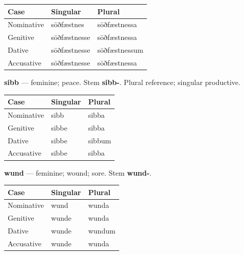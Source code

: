\par\begingroup
\fontsize{10.5}{13.2}\selectfont
\setlength{\LTleft}{0pt}\setlength{\LTright}{\fill}
\noindent
\begin{tabular}{@{}>{\raggedright\arraybackslash}p{33.82mm}>{\raggedright\arraybackslash}p{40.59mm}>{\raggedright\arraybackslash}p{43.97mm}@{}}
\toprule
\textbf{Case} & \textbf{Singular} & \textbf{Plural} \\
\midrule
Nominative & sōðfæstnes & sōðfæstnessa \\
Genitive & sōðfæstnesse & sōðfæstnessa \\
Dative & sōðfæstnesse & sōðfæstnessum \\
Accusative & sōðfæstnesse & sōðfæstnessa \\
\bottomrule
\end{tabular}
\par\endgroup

\textbf{sibb} — feminine; peace. Stem \textbf{sibb-}. Plural reference; singular productive.

\par\begingroup
\fontsize{10.5}{13.2}\selectfont
\setlength{\LTleft}{0pt}\setlength{\LTright}{\fill}
\noindent
\begin{tabular}{@{}>{\raggedright\arraybackslash}p{39.46mm}>{\raggedright\arraybackslash}p{39.46mm}>{\raggedright\arraybackslash}p{39.46mm}@{}}
\toprule
\textbf{Case} & \textbf{Singular} & \textbf{Plural} \\
\midrule
Nominative & sibb & sibba \\
Genitive & sibbe & sibba \\
Dative & sibbe & sibbum \\
Accusative & sibbe & sibba \\
\bottomrule
\end{tabular}
\par\endgroup

\textbf{wund} — feminine; wound; sore. Stem \textbf{wund-}.

\par\begingroup
\fontsize{10.5}{13.2}\selectfont
\setlength{\LTleft}{0pt}\setlength{\LTright}{\fill}
\noindent
\begin{tabular}{@{}>{\raggedright\arraybackslash}p{39.46mm}>{\raggedright\arraybackslash}p{39.46mm}>{\raggedright\arraybackslash}p{39.46mm}@{}}
\toprule
\textbf{Case} & \textbf{Singular} & \textbf{Plural} \\
\midrule
Nominative & wund & wunda \\
Genitive & wunde & wunda \\
Dative & wunde & wundum \\
Accusative & wunde & wunda \\
\bottomrule
\end{tabular}
\par\endgroup

